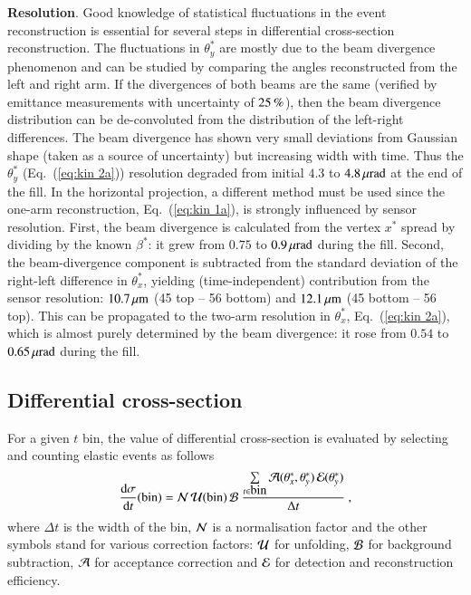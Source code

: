 {\bf Resolution}. Good knowledge of statistical fluctuations in the event reconstruction is essential for several steps in differential cross-section reconstruction. The fluctuations in $\theta_y^*$ are mostly due to the beam divergence phenomenon and can be studied by comparing the angles reconstructed from the left and right arm. If the divergences of both beams are the same (verified by emittance measurements with uncertainty of $25\,{\rm \%}$), then the beam divergence distribution can be de-convoluted from the distribution of the left-right differences. The beam divergence has shown very small deviations from Gaussian shape (taken as a source of uncertainty) but increasing width with time. Thus the $\theta_y^*$ (Eq.~(\ref{eq:kin 2a})) resolution degraded from initial $4.3$ to $4.8\,{\rm \mu rad}$ at the end of the fill. In the horizontal projection, a different method must be used since the one-arm reconstruction, Eq.~(\ref{eq:kin 1a}), is strongly influenced by sensor resolution. First, the beam divergence is calculated from the vertex $x^*$ spread by dividing by the known $\beta^*$: it grew from $0.75$ to $0.9\,{\rm \mu rad}$ during the fill. Second, the beam-divergence component is subtracted from the standard deviation of the right-left difference in $\theta_x^*$, yielding (time-independent) contribution from the sensor resolution: $10.7\,{\rm \mu m}$ (45 top -- 56 bottom) and $12.1\,{\rm \mu m}$ (45 bottom -- 56 top). This can be propagated to the two-arm resolution in $\theta_x^*$, Eq.~({\ref{eq:kin 2a}}), which is almost purely determined by the beam divergence: it rose from $0.54$ to $0.65\,{\rm \mu rad}$ during the fill. 


\subsection{Differential cross-section}

For a given $t$ bin, the value of differential cross-section is evaluated by selecting and counting elastic events as follows
\begin{equation}
{\d\sigma\over \d t}(\hbox{bin}) =
	{\cal N}\, {\cal U}({\rm bin})\, {\cal B}\ 
	{\sum\limits_{t \in \hbox{bin}} {\cal A}(\theta_x^*, \theta_y^*)\, {\cal E}(\theta_y^*)\over \Delta t}\ ,
\end{equation}
where $\Delta t$ is the width of the bin, ${\cal N}$ is a normalisation factor and the other symbols stand for various correction factors:
 ${\cal U}$ for unfolding, ${\cal B}$ for background subtraction, ${\cal A}$ for acceptance correction and ${\cal E}$ for detection and reconstruction efficiency.


